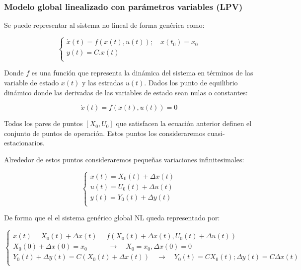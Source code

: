 \documentclass{article}
\begin{document}

\subsubsection{Modelo global linealizado con parámetros variables (LPV)}

Se puede representar al sistema no lineal de forma genérica
como: 

\begin{equation}
    \begin{cases}
        \dot{x}(t) = f(x(t),u(t));  \quad   x(t_{0}) = x_{0}\\
        y(t) = C.x(t)\\
    \end{cases}
\end{equation}

Donde $f$ es una función que representa la dinámica del sistema en términos de las variable 
de estado $x(t)$ y las estradas $u(t)$.  
Dados los punto de equilibrio dinámico donde las derivadas de las variables de estado sean nulas o constantes:

\begin{equation}
    \dot{x}(t) = f(x(t),u(t)) = 0
\end{equation}

Todos los pares de puntos $[X_0,U_0]$ que satisfacen la ecuación anterior definen el conjunto de
puntos de operación. Estos puntos los consideraremos cuasi-estacionarios. 

Alrededor de estos puntos consideraremos pequeñas variaciones infinitesimales:

\begin{equation}
    \begin{cases}
        x(t) = X_{0}(t) + \Delta x(t)\\
        u(t) = U_{0}(t) + \Delta u(t)\\
        y(t) = Y_{0}(t) + \Delta y(t)\\
    \end{cases}
\end{equation}

De forma que el el sistema genérico global NL queda representado por:

\begin{equation}
    \begin{cases}
        \dot{x}(t) = \dot{X}_{0}(t) + \Delta\dot{x}(t) = f(X_{0}(t) + \Delta x(t), U_{0}(t) + \Delta u(t))\\
        X_{0}(0) + \Delta x(0) = x_{0} \quad\quad\quad \rightarrow \quad X_{0} = x_{0}, \Delta x(0) = 0 \\
        Y_{0}(t) + \Delta y(t) = C(X_{0}(t) + \Delta x(t)) \quad\rightarrow\quad Y_{0}(t) = C X_{0}(t); \Delta y(t) = C \Delta x(t)\\
    \end{cases}
\end{equation}
\end{document}
